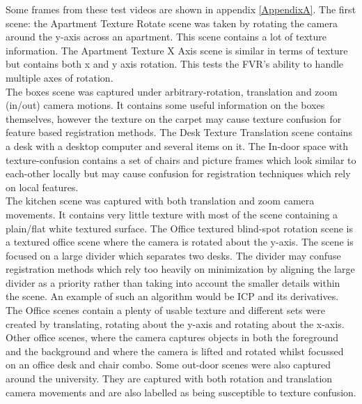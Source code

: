 Some frames from these test videos are shown in appendix \ref{AppendixA}. The first scene: the Apartment Texture Rotate scene was taken by rotating the camera around the y-axis across an apartment. This scene contains a lot of texture information. The Apartment Texture X Axis scene is similar in terms of texture but contains both x and y axis rotation. This tests the FVR's ability to handle multiple axes of rotation. \\


The boxes scene was captured under arbitrary-rotation, translation and zoom (in/out) camera motions. It contains some useful information on the boxes themselves, however the texture on the carpet may cause texture confusion for feature based registration methods. The Desk Texture Translation scene contains a desk with a desktop computer and several items on it. The In-door space with texture-confusion contains a set of chairs and picture frames which look similar to each-other locally but may cause confusion for registration techniques which rely on local features. \\

The kitchen scene was captured with both translation and zoom camera movements. It contains very little texture with most of the scene containing a plain/flat white textured surface. The Office textured blind-spot rotation scene is a textured office scene where the camera is rotated about the y-axis. The scene is focused on a large divider which separates two desks. The divider may confuse registration methods which rely too heavily on minimization by aligning the large divider as a priority rather than taking into account the smaller details within the scene. An example of such an algorithm would be ICP and its derivatives. \\

The Office scenes contain a plenty of usable texture and different sets were created by translating, rotating about the y-axis and rotating about the x-axis. Other office scenes, where the camera captures objects in both the foreground and the background and where the camera is lifted and rotated whilst focussed on an office desk and chair combo. Some out-door scenes were also captured around the university. They are captured with both rotation and translation camera movements and are also labelled as being susceptible to texture confusion. \\

